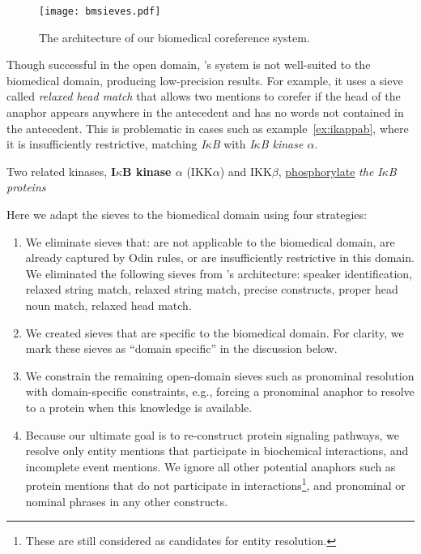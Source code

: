 \begin{figure}
\texttt{[image: bmsieves.pdf]}
\caption{The architecture of our biomedical coreference system.}
\label{fig:arch}
\end{figure}

Though successful in the open domain, 's system is not well-suited to the biomedical domain, producing low-precision results. For example, it uses a sieve called {\it relaxed head match} that allows two mentions to corefer if the head of the anaphor appears anywhere in the antecedent and has no words not contained in the antecedent. This is problematic in cases such as example~\ref{ex:ikappab}, where it is insufficiently restrictive, matching {\it I$\kappa$B} with {\it I$\kappa$B kinase $\alpha$}.

\begin{exe}
	\ex\label{ex:ikappab} Two related kinases, {\bf I$\kappa$B kinase $\alpha$} (IKK$\alpha$) and IKK$\beta$, \underline{phosphorylate} {\em the I$\kappa$B proteins} \textellipsis
\end{exe} 

Here we adapt the sieves to the biomedical domain using four strategies:
\begin{enumerate}
\item We eliminate sieves that: are not applicable to the biomedical domain, are already captured by Odin rules, or are insufficiently restrictive in this domain. We eliminated the following sieves from 's architecture: speaker identification, relaxed string match, relaxed string match, precise constructs, proper head noun match, relaxed head match. 
\item We created sieves that are specific to the biomedical domain. For clarity, we mark these sieves as ``domain specific'' in the discussion below.
\item We constrain the remaining open-domain sieves such as pronominal resolution with domain-specific constraints, e.g., forcing a pronominal anaphor to resolve to a protein when this knowledge is available. 
\item Because our ultimate goal is to re-construct protein signaling pathways, we resolve only entity mentions that participate in biochemical interactions, and incomplete event mentions. We ignore all other potential anaphors such as protein mentions that do not participate in interactions\footnote{These are still considered as candidates for entity resolution.}, and pronominal or nominal phrases in any other constructs. 
\end{enumerate}

